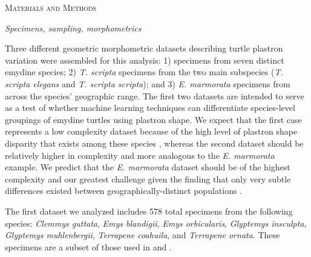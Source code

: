 \documentclass[12pt,letterpaper]{article}
\renewcommand{\section}[1]{%
\bigskip
\begin{center}
\begin{Large}
\normalfont\scshape #1
\medskip
\end{Large}
\end{center}}
\renewcommand{\subsection}[1]{%
\bigskip
\begin{center}
\begin{large}
\normalfont\itshape #1
\end{large}
\end{center}}
\begin{document}
\section{Materials and Methods}
\subsection{Specimens, sampling, morphometrics}
Three different geometric morphometric datasets describing turtle plastron variation were assembled for this analysis: 1) specimens from seven distinct emydine species; 2) \textit{T. scripta} specimens from the two main subspecies (\textit{T. scripta elegans} and \textit{T. scripta scripta}); and 3) \textit{E. marmorata} specimens from across the species' geographic range. The first two datasets are intended to serve as a test of whether machine learning techniques can differentiate species-level groupings of emydine turtles using plastron shape. We expect that the first case represents a low complexity dataset because of the high level of plastron shape disparity that exists among these species \citep{Angielczyk2011}, whereas the second dataset should be relatively higher in complexity and more analogous to the \textit{E. marmorata} example. We predict that the \textit{E. marmorata} dataset should be of the highest complexity and our greatest challenge given the finding that only very subtle differences existed between geographically-distinct populations \citep{Holland1992}.

The first dataset we analyzed includes 578 total specimens from the following species: \textit{Clemmys guttata}, \textit{Emys blandigii}, \textit{Emys orbicularis}, \textit{Glyptemys insculpta}, \textit{Glyptemys muhlenbergii}, \textit{Terrapene coahuila}, and \textit{Terrapene ornata}. These specimens are a subset of those used in \citet{Angielczyk2011} and \citet{Angielczyk2013a}.
\end{document}
